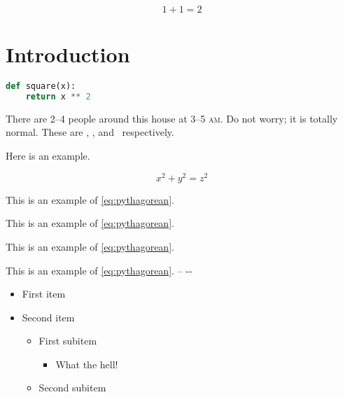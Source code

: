     \label{page:y}
    \begin{equation}
        1 + 1 = 2 \label{eq:a}
    \end{equation}

    \eng
    \section{Introduction}
    \label{sec:intro}

    \lipsum[1]

\begin{lstlisting}[language=python,caption={A square function, obviously.}]
def square(x):
    return x ** 2
\end{lstlisting}

    \lipsum[2]

    There are 2--4 people around this house at 3--5 \textsc{am}.  Do not worry; it is totally normal. These are , , and \ respectively.

    Here is an example.

    \begin{equation}
        x^2 + y^2 = z^2  \label{eq:pythagorean}
    \end{equation}

    This is an example of \eqref{eq:pythagorean}. \lipsum[3]

    \begin{example}
        This is an example of \eqref{eq:pythagorean}.
    \end{example}

    \lipsum[4]

    \begin{example*}[likeme]
        This is an example of \eqref{eq:pythagorean}.
    \end{example*}

    \lipsum[5]
    \begin{note}
        This is an example of \eqref{eq:pythagorean}. \rsq\gsq\bsq\ysq -- {-}{-}
    \end{note}
    \lipsum[6]

    \begin{itemize}
        \item  First item
        \item  Second item
            \begin{itemize}
                \item  First subitem
                    \begin{itemize}
                        \item  What the hell!
                    \end{itemize}
                \item  Second subitem
            \end{itemize}
    \end{itemize}


